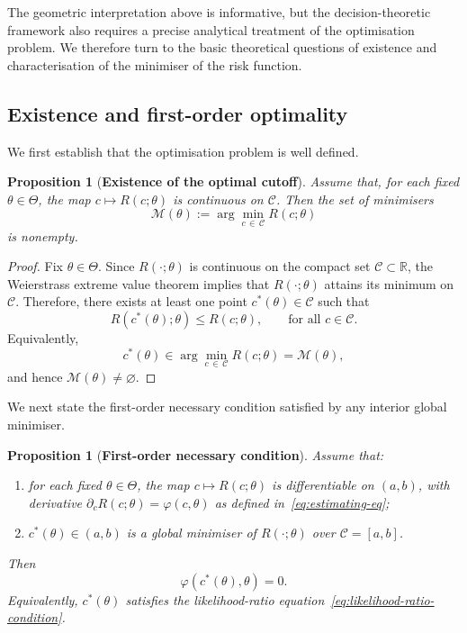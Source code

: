 \documentclass[11pt,a4paper]{article}
\newtheorem{proposition}[theorem]{Proposition}
\theoremstyle{definition}
\theoremstyle{remark}
\newcommand{\1}{\mathbf{1}}
\begin{document}
The geometric interpretation above is informative, but the
decision-theoretic framework also requires a precise analytical
treatment of the optimisation problem. We therefore turn to the
basic theoretical questions of existence and characterisation of
the minimiser of the risk function.

\subsection{Existence and first-order optimality}

We first establish that the optimisation problem is well defined.

\begin{proposition}[\textbf{Existence of the optimal cutoff}]
\label{prop:existence}
Assume that, for each fixed $\theta\in\Theta$, the map
$c\mapsto R(c;\theta)$ is continuous on $\mathcal C$.
Then the set of minimisers
\[
\mathcal M(\theta):=\arg\min_{c \, \in\,\mathcal C} R(c;\theta)
\]
is nonempty.
\end{proposition}

\begin{proof}
Fix $\theta\in\Theta$. Since $R(\cdot;\theta)$ is continuous on
the compact set $\mathcal C\subset\mathbb R$, the Weierstrass
extreme value theorem implies that $R(\cdot;\theta)$ attains
its minimum on $\mathcal C$. Therefore, there exists at least
one point $c^*(\theta)\in\mathcal C$ such that
\[
R(c^*(\theta);\theta)\le R(c;\theta),
\qquad \text{for all } c\in\mathcal C.
\]
Equivalently,
\[
c^*(\theta)\in\arg\min_{c\,\in\,\mathcal C}R(c;\theta)
=\mathcal M(\theta),
\]
and hence $\mathcal M(\theta)\neq\varnothing$.
\end{proof}

We next state the first-order necessary condition satisfied by
any interior global minimiser.

\begin{proposition}[\textbf{First-order necessary condition}]
\label{prop:first-order}
Assume that:
\begin{enumerate}
\item for each fixed $\theta\in\Theta$, the map
      $c\mapsto R(c;\theta)$ is differentiable on $(a,b)$, with
      derivative $\partial_c R(c;\theta)=\varphi(c,\theta)$ as
      defined in~\eqref{eq:estimating-eq};
\item $c^*(\theta)\in(a,b)$ is a global minimiser of
      $R(\cdot;\theta)$ over $\mathcal C=[a,b]$.
\end{enumerate}
Then
\[
\varphi(c^*(\theta),\theta)=0.
\]
Equivalently, $c^*(\theta)$ satisfies the
likelihood-ratio equation~\eqref{eq:likelihood-ratio-condition}.
\end{proposition}
\end{document}
